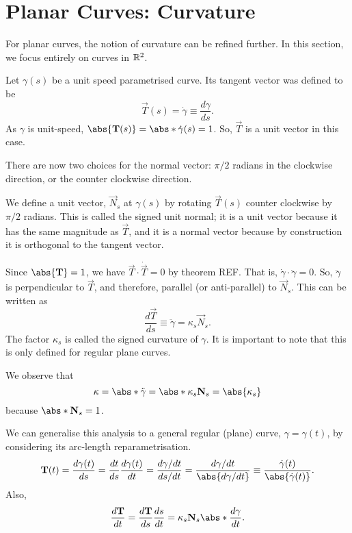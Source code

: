 \documentclass[11pt]{penrose}
\newcommand{\vT}{\vec{T}}
\newcommand{\vN}{\vec{N}}
\newcommand{\keyword}[1]{\textsf{#1}}
\begin{document}
\section{Planar Curves: Curvature}

For planar curves, the notion of curvature can be refined further. In this section, we focus entirely on curves in $\mathbb{R}^2$.

Let $\gamma(s)$ be a unit speed parametrised curve. Its tangent vector was defined to be
\begin{equation}
    \vT(s) = \dot{\gamma} \equiv \frac{d\gamma}{ds}.
    \label{eq:tangent-dfn}
\end{equation}
As $\gamma$ is unit-speed, $\abs{\vT(s)} = \abs*{\dot{\gamma}(s)} = 1$. So, $\vT$ is a unit vector in this case.

There are now two choices for the \keyword{normal} vector: $\pi/2$ radians in the clockwise direction, or the counter clockwise direction.

We define a unit vector, $\vN_s$ at $\gamma(s)$ by rotating $\vT(s)$ counter clockwise by $\pi/2$ radians. This is called the \keyword{signed unit normal}; it is a unit vector because it has the same magnitude as $\vT$, and it is a normal vector because by construction it is orthogonal to the tangent vector.

Since $\abs{\vT} = 1$, we have $\vT \cdot \dot{\vT} = 0$ by theorem REF. That is, $\dot{\gamma} \cdot \ddot{\gamma} = 0$. So, $\ddot{\gamma}$ is perpendicular to $\vT$, and therefore, parallel (or anti-parallel) to $\vN_s$. This can be written as
\begin{equation}
    \frac{d\vT}{ds} \equiv \ddot{\gamma} = \kappa_s \vN_s.
\end{equation}
The factor $\kappa_s$ is called the \keyword{signed curvature} of $\gamma$. It is important to note that this is only defined for regular plane curves.

We observe that
\begin{equation}
    \kappa = \abs*{\ddot{\gamma}} = \abs*{\kappa_s \vN_s} = \abs{\kappa_s}
\end{equation}
because $\abs*{\vN_s} = 1$.


We can generalise this analysis to a general regular (plane) curve, $\gamma = \gamma(t)$, by considering its arc-length reparametrisation.
\begin{equation}
    \vT(t)
    = \frac{d\gamma(t)}{ds}
    = \frac{dt}{ds} \frac{d\gamma(t)}{dt}
    = \frac{d\gamma/dt}{ds/dt}
    = \frac{d\gamma/dt}{\abs{d\gamma/dt}}
    \equiv \frac{\dot{\gamma}(t)}{\abs{\dot{\gamma}(t)}}.
\end{equation}
Also,
\begin{equation*}
    \frac{d\vT}{dt}
    = \frac{d\vT}{ds} \frac{ds}{dt}
    = \kappa_s \vN_s \abs*{\frac{d\gamma}{dt}}.
\end{equation*}
\end{document}
